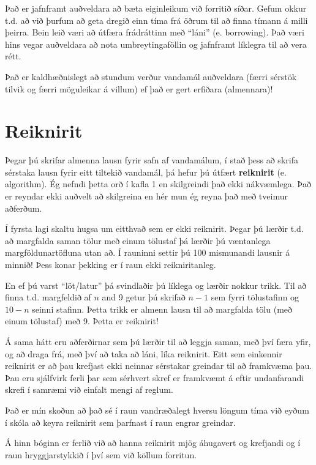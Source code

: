 Það er jafnframt auðveldara að bæta eiginleikum við forritið síðar.
Gefum okkur t.d. að við þurfum að geta dregið einn tíma frá öðrum til að finna tímann á milli þeirra.
Bein leið væri að útfæra frádráttinn með ``láni'' (e. borrowing).
Það væri hins vegar auðveldara að nota umbreytingaföllin og jafnframt líklegra til að vera rétt.

Það er kaldhæðnislegt að stundum verður vandamál auðveldara (færri sérstök tilvik og færri möguleikar á villum) ef það er gert erfiðara (almennara)!

\section{Reiknirit}
\label{algorithm}

Þegar þú skrifar almenna lausn fyrir safn af vandamálum, í stað þess að skrifa sérstaka lausn fyrir eitt tiltekið vandamál, þá hefur þú útfært 
{\bf reiknirit} (e. algorithm).
Ég nefndi þetta orð í kafla 1 en skilgreindi það ekki nákvæmlega.
Það er reyndar ekki auðvelt að skilgreina en hér mun ég reyna það með tveimur aðferðum.

Í fyrsta lagi skaltu hugsa um eitthvað sem er ekki reiknirit.
Þegar þú lærðir t.d. að margfalda saman tölur með einum tölustaf þá lærðir þú væntanlega margföldunartöfluna utan að.
Í rauninni settir þú 100 mismunandi lausnir á minnið!
Þess konar þekking er í raun ekki reikniritanleg.

En ef þú varst ``löt/latur'' þá svindlaðir þú líklega og lærðir nokkur trikk.
Til að finna t.d. margfeldið af $n$ and 9 getur þú skrifað $n-1$ sem fyrri tölustafinn og $10-n$ seinni stafinn.
Þetta trikk er almenn lausn til að margfalda tölu (með einum tölustaf) með 9.
Þetta er reiknirit!

Á sama hátt eru aðferðirnar sem þú lærðir til að leggja saman, með því færa yfir, og að draga frá, með því að taka að láni, líka reiknirit.
Eitt sem einkennir reiknirit er að þau krefjast ekki neinnar sérstakar greindar til að framkvæma þau.
Þau eru sjálfvirk ferli þar sem sérhvert skref er framkvæmt á eftir undanfarandi skrefi í samræmi við einfalt mengi af reglum.

Það er mín skoðun að það sé í raun vandræðalegt hversu löngum tíma við eyðum í skóla að keyra reiknirit sem þarfnast í raun engrar greindar.

Á hinn bóginn er ferlið við að hanna reiknirit mjög áhugavert og krefjandi og í raun hryggjarstykkið í því sem við köllum forritun.

